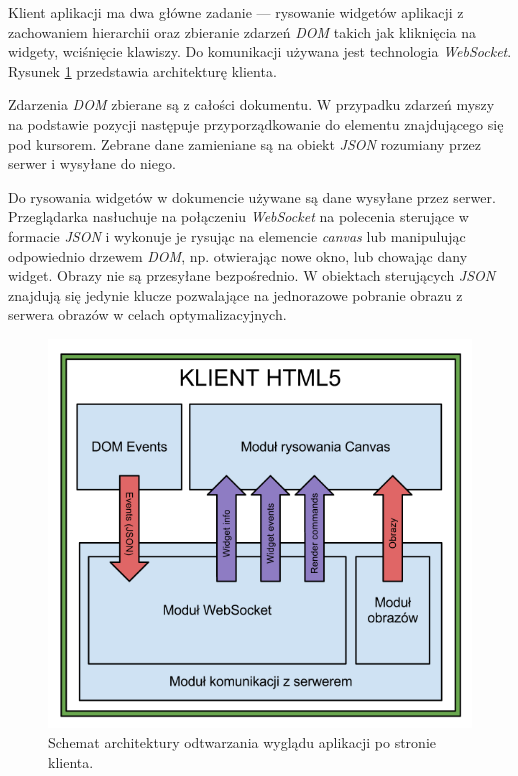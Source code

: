 Klient aplikacji ma dwa główne zadanie --- rysowanie widgetów aplikacji z zachowaniem hierarchii oraz zbieranie zdarzeń \emph{DOM} takich jak kliknięcia na widgety, wciśnięcie klawiszy. Do komunikacji używana jest technologia \emph{WebSocket}. Rysunek \ref{fig:arch-render} przedstawia architekturę klienta.

Zdarzenia \emph{DOM} zbierane są z całości dokumentu. W przypadku zdarzeń myszy na podstawie pozycji następuje przyporządkowanie do elementu znajdującego się pod kursorem. Zebrane dane zamieniane są na obiekt \emph{JSON} rozumiany przez serwer i wysyłane do niego.

Do rysowania widgetów w dokumencie używane są dane wysyłane przez serwer. Przeglądarka nasłuchuje na połączeniu \emph{WebSocket} na polecenia sterujące w formacie \emph{JSON} i wykonuje je rysując na elemencie \emph{canvas} lub manipulując odpowiednio drzewem \emph{DOM}, np. otwierając nowe okno, lub chowając dany widget. Obrazy nie są przesyłane bezpośrednio. W obiektach sterujących \emph{JSON} znajdują się jedynie klucze pozwalające na jednorazowe pobranie obrazu z serwera obrazów w celach optymalizacyjnych.

\begin{figure}[H]
\centering
\includegraphics[width=0.8\linewidth]{img/arch-render}
\caption{Schemat architektury odtwarzania wyglądu aplikacji po stronie klienta.}
\label{fig:arch-render}
\end{figure}
